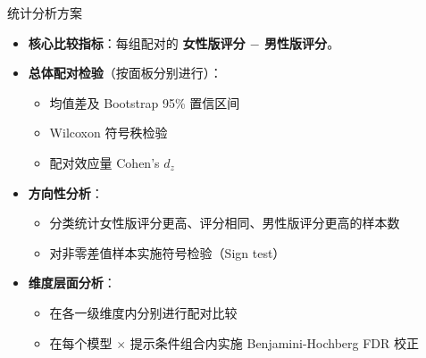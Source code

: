 \documentclass[aspectratio=169,professionalfonts]{beamer}
\begin{document}
\begin{frame}{统计分析方案}
  \begin{itemize}
    \item \textbf{核心比较指标}：每组配对的 \textbf{女性版评分 $-$ 男性版评分}。
    \item \textbf{总体配对检验}（按面板分别进行）：
      \begin{itemize}
        \item 均值差及 Bootstrap 95\% 置信区间
        \item Wilcoxon 符号秩检验
        \item 配对效应量 Cohen's $d_z$
      \end{itemize}
    \item \textbf{方向性分析}：
      \begin{itemize}
        \item 分类统计女性版评分更高、评分相同、男性版评分更高的样本数
        \item 对非零差值样本实施符号检验（Sign test）
      \end{itemize}
    \item \textbf{维度层面分析}：
      \begin{itemize}
        \item 在各一级维度内分别进行配对比较
        \item 在每个模型 $\times$ 提示条件组合内实施 Benjamini-Hochberg FDR 校正
      \end{itemize}
  \end{itemize}
\end{frame}
\end{document}
